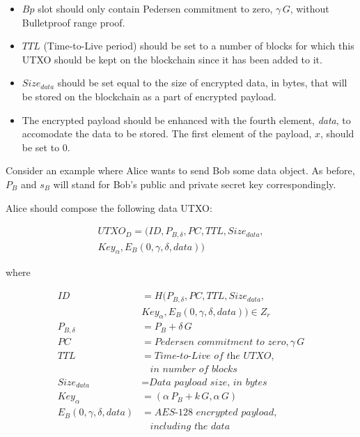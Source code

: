 \documentclass[8pt,fleqn,openany]{book}
\begin{document}
\begin{itemize}
  \item {$Bp$ slot should only contain Pedersen commitment to zero, $\gamma \, G$, without Bulletproof range proof.}
  \item {$TTL$ (Time-to-Live period) should be set to a number of blocks for which this UTXO should be kept on the blockchain since it has been added to it.}
  \item {$Size_{data}$ should be set equal to the size of encrypted data, in bytes, that will be stored on the blockchain as a part of encrypted payload.}
  \item {The encrypted payload should be enhanced with the fourth element, \textit{data}, to accomodate the data to be stored. The first element of the payload, $x$, should be set to 0.}
\end{itemize}

Consider an example where Alice wants to send Bob some data object. As before, $P_B$ and $s_B$ will stand for Bob’s public and private secret key correspondingly. 

Alice should compose the following data UTXO:

\begin{multline*}
  UTXO_D = (ID, P_{B, \delta}, PC, TTL, Size_{data},\\
      Key_{\alpha}, E_B(0, \gamma, \delta, data))
\end{multline*}
  
  where
  
\begin{align*}
  ID &= H(P_{B, \delta}, PC, TTL, Size_{data}, \\ 
    & Key_{\alpha}, E_B(0, \gamma, \delta, data)) \in Z_r \\
  P_{B, \delta} &= P_B + \delta \, G \\
  PC &= \textit{Pedersen commitment to zero}, \gamma \, G \\
  TTL &= \textit{Time-to-Live of the UTXO},\\
  & \ \ \ \ \textit{in number of blocks} \\
  Size_{data} &= \textit{Data payload size, in bytes} \\
  Key_{\alpha} &= (\alpha \, P_{B} + k \, G, \alpha \, G ) \\
  E_B(0, \gamma, \delta, data) &= \textit{AES-128 encrypted payload}, \\
  & \ \ \ \ \textit{including the data}
\end{align*}
\end{document}
